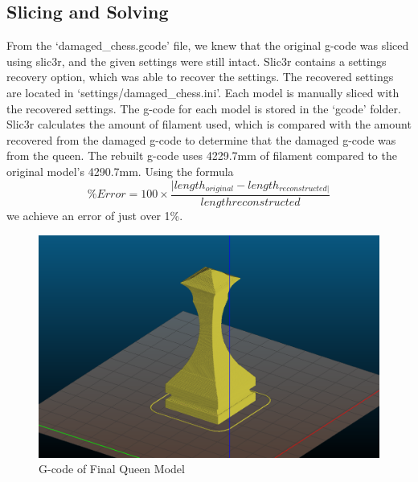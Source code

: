 \documentclass{IEEEtran}
\begin{document}
        \subsection{Slicing and Solving}
            From the `damaged\_chess.gcode' file, we knew that the original g-code was sliced using slic3r, and the given settings were still intact.  Slic3r contains a settings
            recovery option, which was able to recover the settings.  The recovered settings are located in `settings/damaged\_chess.ini'.  Each model is manually sliced with the recovered
            settings.  The g-code for each model is stored in the `gcode' folder.  Slic3r calculates the amount of filament used, which is compared with the amount recovered from
            the damaged g-code to determine that the damaged g-code was from the queen.  The rebuilt g-code uses 4229.7mm of filament compared to the original model's 4290.7mm.  Using the formula
            $$ \%Error = 100 \times \frac{|length_{original} - length_{reconstructed|}}{length{reconstructed}} $$
            we achieve an error of just over 1\%.
            \begin{figure}
                \includegraphics{../gcode/queen.png}
                \caption{G-code of Final Queen Model}
            \end{figure}
\end{document}
